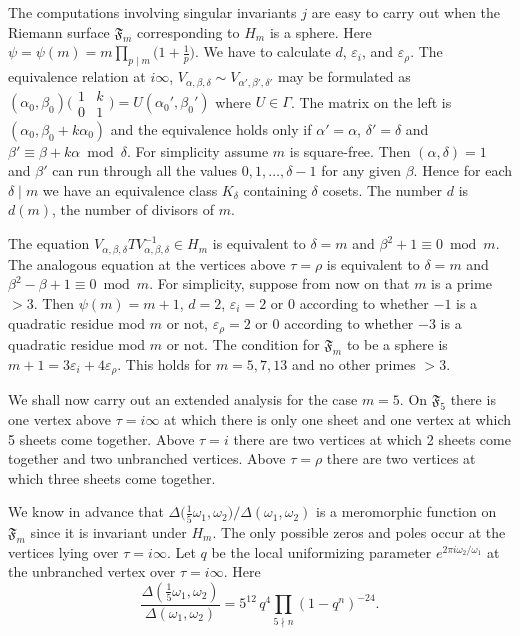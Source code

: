 The computations involving singular invariants $j$ are easy to carry out
when the Riemann surface $\mathfrak{F}_{m}$ corresponding to $H_{m}$ is a
sphere. Here $\psi=\psi(m)=m\prod_{p\mid m}\bigl(1+\frac{1}{p}\bigr)$.
We have to calculate $d$, $\varepsilon_{i}$, and $\varepsilon_{\rho}$.
The equivalence relation at $i\infty$,
$V_{\alpha,\beta,\delta}\sim V_{\alpha',\beta',\delta'}$ may be formulated
as $(\alpha_{0},\beta_{0})\bigl(\begin{smallmatrix}1&k\\ 0&1\end{smallmatrix}
\bigr)=U(\alpha_{0}',\beta_{0}')$ where $U\in\Gamma$. The matrix on the
left is $(\alpha_{0},\beta_{0}+k\alpha_{0})$ and the equivalence holds
only if $\alpha'=\alpha$, $\delta'=\delta$ and
$\beta'\equiv\beta+k\alpha\bmod\delta$. For simplicity assume $m$ is
square-free. Then $(\alpha,\delta)=1$ and $\beta'$ can run through all
the values $0,1,\ldots,\delta-1$ for any given $\beta$. Hence for each
$\delta\mid m$ we have an equivalence class $K_{\delta}$ containing
$\delta$ cosets. The number $d$ is $d(m)$, the number of divisors of
$m$.

The equation $V_{\alpha,\beta,\delta}TV_{\alpha,\beta,\delta}^{-1}\in
H_{m}$ is equivalent to $\delta=m$ and $\beta^{2}+1\equiv 0\bmod m$. The
analogous equation at the vertices above $\tau=\rho$ is equivalent to
$\delta=m$ and $\beta^{2}-\beta+1\equiv 0\bmod m$. For simplicity,
suppose from now on that $m$ is a prime $>3$. Then $\psi(m)=m+1$, $d=2$,
$\varepsilon_{i}=2$ or $0$ according to whether $-1$ is a quadratic
residue mod $m$ or not, $\varepsilon_{\rho}=2$ or $0$ according to
whether $-3$ is a quadratic residue mod $m$ or not. The condition for
$\mathfrak{F}_{m}$ to be a sphere is $m+1=3\varepsilon_{i}
+4\varepsilon_{\rho}$. This holds for $m=5,7,13$ and no other primes $>3$.

We shall now carry out an extended analysis for the case $m=5$. On
$\mathfrak{F}_{5}$ there is one vertex above $\tau=i\infty$ at which
there is only one sheet and one vertex at which 5 sheets come together.
Above $\tau=i$ there are two vertices at which 2 sheets come together and
two unbranched vertices. Above $\tau=\rho$ there are two vertices at
which three sheets come together.

We know in advance that
$\Delta\bigl(\tfrac{1}{5}\omega_{1},\omega_{2}\bigr)
/\Delta(\omega_{1},\omega_{2})$ is a meromorphic function on
$\mathfrak{F}_{m}$ since it is invariant under $H_{m}$. The only possible
zeros and poles occur at the vertices lying over $\tau=i\infty$. Let $q$
be the local uniformizing parameter $e^{2\pi i\omega_{2}/\omega_{1}}$ at
the unbranched vertex over $\tau=i\infty$. Here
\[
\frac{\Delta(\frac{1}{5}\omega_{1},\omega_{2})}{\Delta(\omega_{1},\omega_{2})}
=5^{12}\,q^{4}\prod_{5\nmid n}(1-q^{n})^{-24}.
\]

